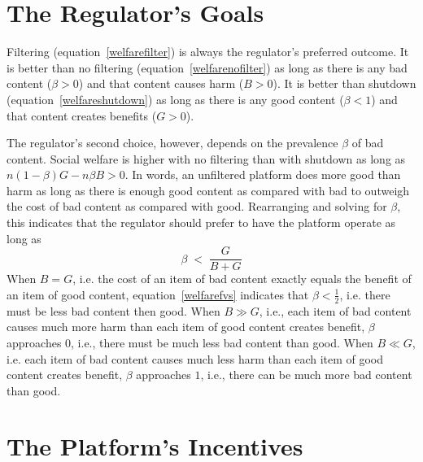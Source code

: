 \section{The Regulator's Goals}

Filtering (equation~\ref{welfarefilter}) is always the regulator's preferred outcome. It is better than no filtering (equation~\ref{welfarenofilter}) as long as there is any bad content ($\beta > 0$) and that content causes harm ($B > 0$). It is better than shutdown (equation~\ref{welfareshutdown}) as long as there is any good content ($\beta < 1$) and that content creates benefits ($G > 0$).

The regulator's second choice, however, depends on the prevalence $\beta$ of bad content. Social welfare is higher with no filtering than with shutdown as long as $n(1-\beta)G - n \beta B > 0$. In words, an unfiltered platform does more good than harm as long as there is enough good content as compared with bad to outweigh the cost of bad content as compared with good. Rearranging and solving for $\beta$, this indicates that the regulator should prefer to have the platform operate as long as
\begin{equation}
\label{welfarefvs}
\beta \;<\; \frac{G}{B+G}
\end{equation}
When $B=G$, i.e. the cost of an item of bad content exactly equals the benefit of an item of good content, equation~\ref{welfarefvs} indicates that $\beta < \frac{1}{2}$, i.e. there must be less bad content then good. When $B \gg G$, i.e., each item of bad content causes much more harm than each item of good content creates benefit, $\beta$ approaches $0$, i.e., there must be much less bad content than good. When $B \ll G$, i.e. each item of bad content causes much less harm than each item of good content creates benefit, $\beta$ approaches $1$, i.e., there can be much more bad content than good.

\section{The Platform's Incentives}

